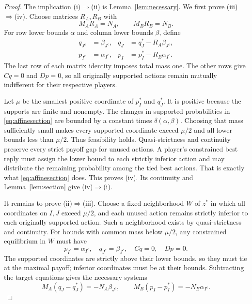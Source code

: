 \documentclass[11pt]{article}
\theoremstyle{definition}
\theoremstyle{remark}
\begin{document}
\begin{proof}
The implication (i)$\Rightarrow$(ii) is Lemma~\ref{lem:necessary}.
We first prove (iii)$\Rightarrow$(iv). Choose matrices $R_A,R_B$ with
\[
 M_A R_A=N_A,\qquad M_B R_B=N_B.
\]
For row lower bounds $\alpha$ and column lower bounds $\beta$, define
\begin{equation}\label{eq:affinesection}
\begin{aligned}
 q_{J^c}&=\beta_{J^c},&q_J&=q_J^*-R_A\beta_{J^c},\\
 p_{I^c}&=\alpha_{I^c},&p_I&=p_I^*-R_B\alpha_{I^c}.
\end{aligned}
\end{equation}
The last row of each matrix identity imposes total mass one. The other
rows give $Cq=0$ and $Dp=0$, so all originally supported actions remain
mutually indifferent for their respective players.

Let $\mu$ be the smallest positive coordinate of $p_I^*$ and $q_J^*$.
It is positive because the supports are finite and nonempty. The changes in
supported probabilities in \eqref{eq:affinesection} are bounded by a constant
times $\delta(\alpha,\beta)$. Choosing that mass sufficiently small makes every
supported coordinate exceed $\mu/2$ and all lower bounds less than $\mu/2$.
Thus feasibility holds. Quasi-strictness and continuity preserve every strict
payoff gap for unused actions. A player's constrained best reply must assign
the lower bound to each strictly inferior action and may distribute the
remaining probability among the tied best actions. That is exactly what
\eqref{eq:affinesection} does. This proves (iv). Its continuity and
Lemma~\ref{lem:section} give (iv)$\Rightarrow$(i).

It remains to prove (ii)$\Rightarrow$(iii). Choose a fixed neighborhood $W$
of $z^*$ in which all coordinates on $I,J$ exceed $\mu/2$, and each unused
action remains strictly inferior to each originally supported action.
Such a neighborhood exists by quasi-strictness and continuity.
For bounds with common mass below $\mu/2$, any constrained equilibrium in
$W$ must have
\[
 p_{I^c}=\alpha_{I^c},\quad q_{J^c}=\beta_{J^c},\quad Cq=0,\quad Dp=0.
\]
The supported coordinates are strictly above their lower bounds, so they
must tie at the maximal payoff; inferior coordinates must be at their
bounds. Subtracting the target equations gives the necessary systems
\begin{equation}\label{eq:necessarysystems}
 M_A(q_J-q_J^*)=-N_A\beta_{J^c},\qquad
 M_B(p_I-p_I^*)=-N_B\alpha_{I^c}.
\end{equation}


\end{proof}
\end{document}
